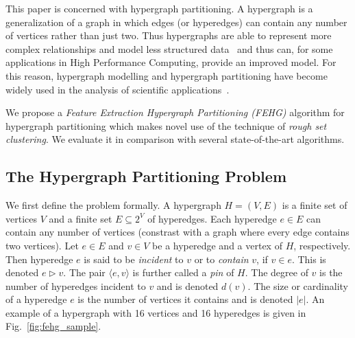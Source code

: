 \documentclass[twocolumn]{svjour3}          \smartqed
\begin{document}
This paper is concerned with hypergraph partitioning.  A hypergraph is a generalization of a graph in which edges (or hyperedges) can contain any number of vertices rather than just two.  Thus hypergraphs are able to represent more complex relationships and model less structured data~\cite{catayk1999,hendrickson1998graph,wang2014bilionnode} and thus can, for some applications in High Performance Computing, provide an improved model.
For this reason, hypergraph modelling and hypergraph partitioning have become widely used in the analysis of scientific applications~\cite{alp1996,catayk1999,curino2010schism,bey2014,hu2014,marquez2015,tian2009,zhou2006learning}. 

We propose a \textit{Feature Extraction Hypergraph Partitioning (FEHG)} algorithm for hypergraph partitioning which makes novel use of the technique of \textit{rough set clustering}.  We evaluate it in comparison with several state-of-the-art algorithms.



\subsection{The Hypergraph Partitioning Problem}\label{sec:hpart_problem}

We first define the problem formally.  A hypergraph $H=(V,E)$ is a finite set of vertices $V$ and a finite set $E \subseteq 2^V$ of hyperedges.  Each hyperedge $e \in E$ can contain any number of vertices (constrast with a graph where every edge contains two vertices). Let $e \in E$ and $v \in V$ be a hyperedge and a vertex of $H$, respectively. Then hyperedge $e$ is said to be \textit{incident} to $v$ or to \textit{contain} $v$, if $v \in e$.  This is denoted $e \triangleright v$. The pair $\langle e,v \rangle$ is further called a \textit{pin} of $H$. The degree of $v$ is the number of hyperedges incident to $v$ and is denoted $d(v)$. The size or cardinality of a hyperedge $e$ is the number of vertices it contains and is denoted $|e|$. An example of a hypergraph with 16 vertices and 16 hyperedges is given in Fig.~\ref{fig:fehg_sample}.
\end{document}
